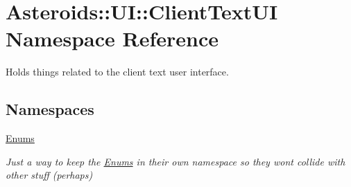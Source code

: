\hypertarget{namespaceAsteroids_1_1UI_1_1ClientTextUI}{}\section{Asteroids\+:\+:UI\+:\+:Client\+Text\+UI Namespace Reference}
\label{namespaceAsteroids_1_1UI_1_1ClientTextUI}


Holds things related to the client text user interface.  


\subsection*{Namespaces}
\begin{DoxyCompactItemize}
\item 
 \hyperlink{namespaceAsteroids_1_1UI_1_1ClientTextUI_1_1Enums}{Enums}
\begin{DoxyCompactList}\small\item\em Just a way to keep the \hyperlink{namespaceAsteroids_1_1UI_1_1ClientTextUI_1_1Enums}{Enums} in their own namespace so they won\textquotesingle{}t collide with other stuff (perhaps) \end{DoxyCompactList}\end{DoxyCompactItemize}
